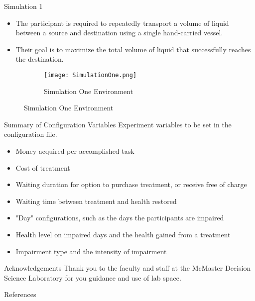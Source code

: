\documentclass[22pt]{beamer}
\begin{document}
\begin{frame}[fragile]
\begin{textblock}{7.25}
\begin{block}{Simulation 1}
\begin{itemize}
\item The participant is required to repeatedly transport a
volume of liquid between a source and destination using a single hand-carried
vessel.
\item Their goal is to maximize the total volume of liquid that successfully
reaches the destination.
\end{itemize}

\begin{figure}
\begin{figure}
    \texttt{[image: SimulationOne.png]}
  \caption{Simulation One Environment}
\label{fig:room}
\end{figure}
\end{figure}




\end{block}

\begin{block}{Summary of Configuration Variables}
Experiment variables to be set in the configuration file.
\begin{itemize}
\item Money acquired per accomplished task
\item Cost of treatment
\item Waiting duration for option to purchase treatment, or receive free of charge
\item Waiting time between treatment and health restored
\item "Day" configurations, such as the days the participants are impaired
\item Health level on impaired days and the health gained from a treatment
\item Impairment type and the intensity of impairment
\end{itemize}
\end{block}




\begin{block}{Acknowledgements}
Thank you to the faculty and staff at the McMaster Decision Science Laboratory for you guidance and use of lab space.
\end{block}

\begin{block}{References}

{\scriptsize
}
\end{block}



\end{textblock}
\end{frame}
\end{document}
